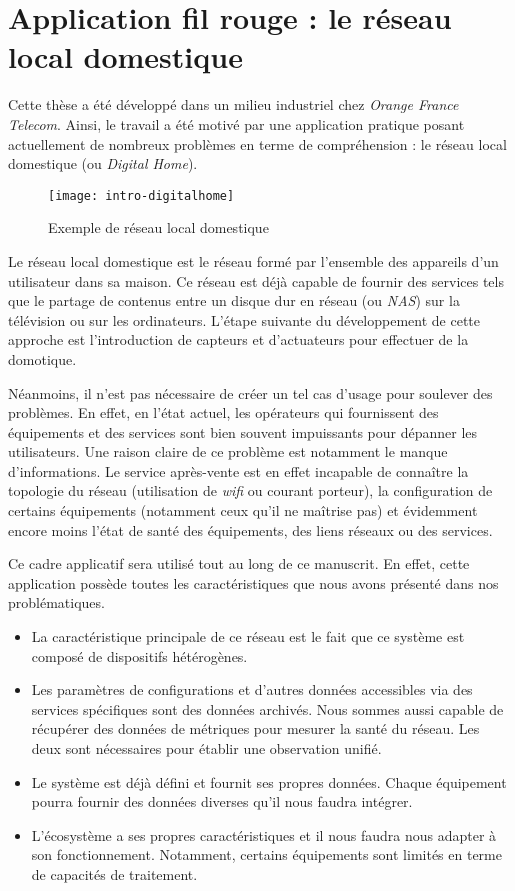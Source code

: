 \section{Application fil rouge : le réseau local domestique}\label{sec:introduction:digitalhome}
Cette thèse a été développé dans un milieu industriel chez \textit{Orange France Telecom}. Ainsi, le travail a été motivé par une application pratique posant actuellement de nombreux problèmes en terme de compréhension : le réseau local domestique (ou \textit{Digital Home}).

\begin{figure}[ht]
\centering
\texttt{[image: intro-digitalhome]}
\caption{Exemple de réseau local domestique}
\end{figure}

Le réseau local domestique est le réseau formé par l'ensemble des appareils d'un utilisateur dans sa maison. Ce réseau est déjà capable de fournir des services tels que le partage de contenus entre un disque dur en réseau (ou \textit{NAS}) sur la télévision ou sur les ordinateurs. L'étape suivante du développement de cette approche est l'introduction de capteurs et d'actuateurs pour effectuer de la domotique.

Néanmoins, il n'est pas nécessaire de créer un tel cas d'usage pour soulever des problèmes. En effet, en l'état actuel, les opérateurs qui fournissent des équipements et des services sont bien souvent impuissants pour dépanner les utilisateurs. Une raison claire de ce problème est notamment le manque d'informations. Le service après-vente est en effet incapable de connaître la topologie du réseau (utilisation de \textit{wifi} ou courant porteur), la configuration de certains équipements (notamment ceux qu'il ne maîtrise pas) et évidemment encore moins l'état de santé des équipements, des liens réseaux ou des services.

Ce cadre applicatif sera utilisé tout au long de ce manuscrit. En effet, cette application possède toutes les caractéristiques que nous avons présenté dans nos problématiques.
\begin{itemize}
	\item La caractéristique principale de ce réseau est le fait que ce système est composé de dispositifs hétérogènes.
	\item Les paramètres de configurations et d'autres données accessibles via des services spécifiques sont des données archivés. Nous sommes aussi capable de récupérer des données de métriques pour mesurer la santé du réseau. Les deux sont nécessaires pour établir une observation unifié.
	\item Le système est déjà défini et fournit ses propres données. Chaque équipement pourra fournir des données diverses qu'il nous faudra intégrer.
	\item L'écosystème a ses propres caractéristiques et il nous faudra nous adapter à son fonctionnement. Notamment, certains équipements sont limités en terme de capacités de traitement.
\end{itemize}